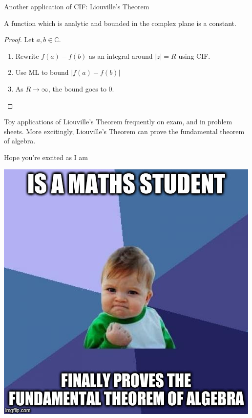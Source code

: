 \documentclass{beamer}
\newcommand{\C}{\mathbb{C}}
\begin{document}
\begin{frame}{Another application of CIF: Liouville's Theorem}
\begin{theorem}
A function which is analytic and bounded in the complex plane is a constant.
\end{theorem}
\begin{proof}Let $a, b\in \C$.
\begin{enumerate}
    \item Rewrite $f(a)-f(b)$ as an integral around $|z|=R$ using CIF.  
    \item Use ML to bound $|f(a)-f(b)|$
    \item As $R\to\infty$, the bound goes to 0.
\end{enumerate}    
\end{proof}

Toy applications of Liouville's Theorem frequently on exam, and in problem sheets.  More excitingly, Liouville's Theorem can prove the fundamental theorem of algebra.
\end{frame}

\begin{frame}{Hope you're excited as I am}
\begin{center}
    \includegraphics[width=\textwidth,height=0.8\textheight,keepaspectratio]{FundamentalTheoremSuccess.jpg}
\end{center}


\end{frame}
\end{document}
